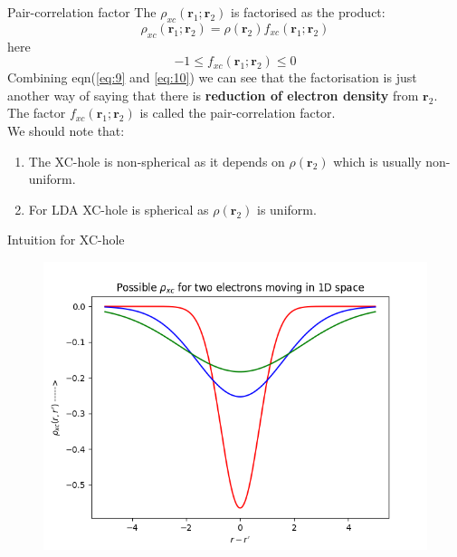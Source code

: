 \documentclass{beamer}
\begin{document}
	\begin{frame}[t]{Pair-correlation factor}
	The $\rho_{xc}(\textbf{r}_1;\textbf{r}_2)$ is factorised as the product:
	\begin{equation}\label{eq:9}
	\rho_{xc}(\textbf{r}_1;\textbf{r}_2) = \rho(\textbf{r}_2)f_{xc}(\textbf{r}_1;\textbf{r}_2)
	\end{equation}
	here 
	\begin{equation}\label{eq:10}
	-1\leqslant f_{xc}(\textbf{r}_1;\textbf{r}_2) \leqslant 0
	\end{equation}
	Combining eqn(\ref{eq:9} and \ref{eq:10}) we can see that the factorisation is just another way of saying that there is \textbf{reduction of electron density} from $\textbf{r}_2$. The factor $f_{xc}(\textbf{r}_1;\textbf{r}_2)$ is called the pair-correlation factor.\pause \\
	We should note that:\pause
	\begin{enumerate}
	\item{The XC-hole is non-spherical as it depends on $\rho(\textbf{r}_2)$ which is usually non-uniform.}\pause
	\item{For LDA XC-hole is spherical as $\rho(\textbf{r}_2)$ is uniform.}
	\end{enumerate}
	\end{frame}	
	
	\begin{frame}[t]{Intuition for XC-hole}
	\begin{figure}
	\centering
	\includegraphics[scale=0.65]{nxc.png}
	\end{figure}
	\end{frame}		
	
\end{document}
